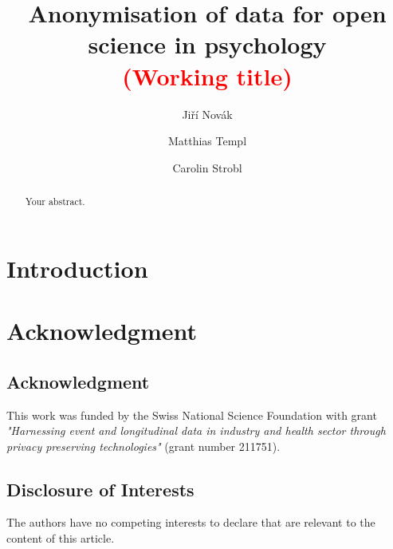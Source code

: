 \documentclass{article}
\title{Anonymisation of data for open science in psychology \\
\textcolor{red}{(Working title)} 
}
\author{Jiří Novák \and 
        Matthias Templ \and 
        Carolin Strobl
        }
\begin{document}
\maketitle

\begin{abstract}
Your abstract.
\end{abstract}


\section{Introduction}






\section{Acknowledgment} 
\subsection{Acknowledgment} 
This work was funded by the Swiss National Science
Foundation with grant \textit{"Harnessing event and longitudinal data in industry and health sector through privacy preserving technologies"} (grant number 211751).

\subsection{Disclosure of Interests} 
The authors have no competing interests to declare that are
relevant to the content of this article. 




\end{document}
